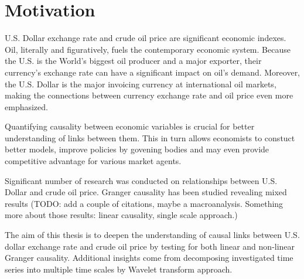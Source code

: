 \section{Motivation} \label{sec:motivation}

U.S. Dollar exchange rate and crude oil price are significant economic indexes.
Oil, literally and figuratively, fuels the contemporary economic system.
Because the U.S. is the World's biggest oil producer and a major exporter, their currency's exchange rate 
can have a significant impact on oil's demand. Moreover, the U.S. Dollar is the major invoicing currency
at international oil markets, making the connections between currency exchange rate and oil price even more
emphasized.

Quantifying causality between economic variables is crucial for better understanding of links between them.
This in turn allows economists to constuct better models, improve policies by govening bodies and may even 
provide competitive advantage for various market agents.

Significant number of research was conducted  on relationships between U.S. Dollar and crude oil price.
Granger causality has been studied revealing mixed results (TODO: add a couple of citations, maybe a macroanalysis. 
Something more about those results: linear causality, single scale approach.)

The aim of this thesis is to deepen the understanding of causal links between U.S. dollar exchange rate
and crude oil price by testing for both linear and non-linear Granger causality.
Additional insights come from decomposing investigated time series into multiple time scales by Wavelet
transform approach.
